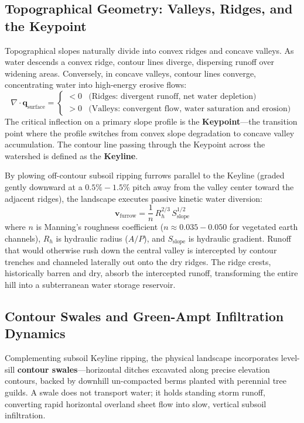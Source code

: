 \subsection{Topographical Geometry: Valleys, Ridges, and the Keypoint}
Topographical slopes naturally divide into convex ridges and concave valleys. As water descends a convex ridge, contour lines diverge, dispersing runoff over widening areas. Conversely, in concave valleys, contour lines converge, concentrating water into high-energy erosive flows:
\begin{equation}
\nabla \cdot \mathbf{q}_{\mathrm{surface}} = 
\begin{cases}
< 0 & \text{(Ridges: divergent runoff, net water depletion)} \\
> 0 & \text{(Valleys: convergent flow, water saturation and erosion)}
\end{cases}
\label{eq:contour_divergence}
\end{equation}
The critical inflection on a primary slope profile is the \textbf{Keypoint}---the transition point where the profile switches from convex slope degradation to concave valley accumulation. The contour line passing through the Keypoint across the watershed is defined as the \textbf{Keyline}.

By plowing off-contour subsoil ripping furrows parallel to the Keyline (graded gently downward at a $0.5\% - 1.5\%$ pitch away from the valley center toward the adjacent ridges), the landscape executes passive kinetic water diversion:
\begin{equation}
\mathbf{v}_{\mathrm{furrow}} = \frac{1}{n} \, R_h^{2/3} \, S_{\mathrm{slope}}^{1/2}
\label{eq:manning_furrow}
\end{equation}
where $n$ is Manning's roughness coefficient ($n \approx 0.035 - 0.050$ for vegetated earth channels), $R_h$ is hydraulic radius ($A/P$), and $S_{\mathrm{slope}}$ is hydraulic gradient. Runoff that would otherwise rush down the central valley is intercepted by contour trenches and channeled laterally out onto the dry ridges. The ridge crests, historically barren and dry, absorb the intercepted runoff, transforming the entire hill into a subterranean water storage reservoir.

\subsection{Contour Swales and Green-Ampt Infiltration Dynamics}
Complementing subsoil Keyline ripping, the physical landscape incorporates level-sill \textbf{contour swales}---horizontal ditches excavated along precise elevation contours, backed by downhill un-compacted berms planted with perennial tree guilds. A swale does not transport water; it holds standing storm runoff, converting rapid horizontal overland sheet flow into slow, vertical subsoil infiltration.

